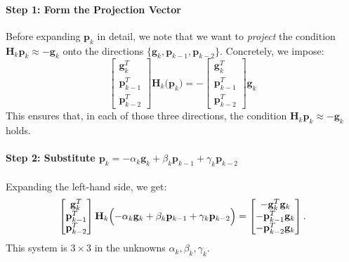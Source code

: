 \documentclass[12pt]{article}
\begin{document}
\paragraph{Step 1: Form the Projection Vector}
Before expanding \(\mathbf{p}_k\) in detail, we note that we want to \emph{project} the condition \(\mathbf{H}_k \mathbf{p}_k \approx -\mathbf{g}_k\) onto the directions \(\{\mathbf{g}_k, \mathbf{p}_{k-1}, \mathbf{p}_{k-2}\}\). Concretely, we impose:
\[
\begin{bmatrix}
\mathbf{g}_k^T \\
\mathbf{p}_{k-1}^T \\
\mathbf{p}_{k-2}^T
\end{bmatrix}
\mathbf{H}_k \bigl(\mathbf{p}_k\bigr)
=
-\begin{bmatrix}
\mathbf{g}_k^T \\
\mathbf{p}_{k-1}^T \\
\mathbf{p}_{k-2}^T
\end{bmatrix}  \mathbf{g}_k
\]
This ensures that, in each of those three directions, the condition \(\mathbf{H}_k \mathbf{p}_k \approx -\mathbf{g}_k\) holds.

\paragraph{Step 2: Substitute \(\mathbf{p}_k = -\alpha_k \mathbf{g}_k + \beta_k \mathbf{p}_{k-1} + \gamma_k \mathbf{p}_{k-2}\)}
Expanding the left-hand side, we get:
\[
\begin{bmatrix}
\mathbf{g}_k^T \\
\mathbf{p}_{k-1}^T \\
\mathbf{p}_{k-2}^T
\end{bmatrix}
\mathbf{H}_k \Bigl(-\alpha_k \mathbf{g}_k + \beta_k \mathbf{p}_{k-1} + \gamma_k \mathbf{p}_{k-2}\Bigr)
=
\begin{bmatrix}
-\mathbf{g}_k^T \mathbf{g}_k \\
-\mathbf{p}_{k-1}^T \mathbf{g}_k \\
-\mathbf{p}_{k-2}^T \mathbf{g}_k
\end{bmatrix}.
\]
This system is \(3 \times 3\) in the unknowns \(\alpha_k, \beta_k, \gamma_k\).
\end{document}

